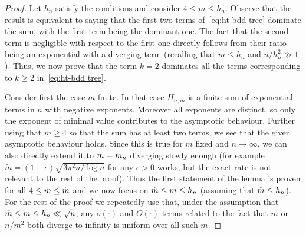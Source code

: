 \documentclass{article}
\newcommand{\1}{\mathbbm{1}}								%
\theoremstyle{definition}
\numberwithin{equation}{section}
\begin{document}
\begin{proof}
    Let $h_n$ satisfy the conditions and consider $4\leq m\leq h_n$.
    Observe that the result is equivalent to saying that the first two terms of~\eqref{eq:ht-bdd tree} dominate the sum, with the first term being the dominant one.
    The fact that the second term is negligible with respect to the first one directly follows from their ratio being an exponential with a diverging term (recalling that $m\leq h_n$ and $n/h_n^2\gg1$).
    Thus, we now prove that the term $k=2$ dominates all the terms corresponding to $k\geq2$ in~\eqref{eq:ht-bdd tree}.

    Consider first the case $m$ finite.
    In that case $H_{n,m}$ is a finite sum of exponential terms in $n$ with negative exponents.
    Moreover all exponents are distinct, so only the exponent of minimal value contributes to the asymptotic behaviour.
    Further using that $m\geq4$ so that the sum has at least two terms, we see that the given asymptotic behaviour holds.
    Since this is true for $m$ fixed and $n\rightarrow\infty$, we can also directly extend it to $\Tilde{m}=\Tilde{m}_n$ diverging slowly enough (for example $\tilde{m}=(1-\epsilon)\sqrt{3\pi^2n/\log n}$ for any $\epsilon>0$ works, but the exact rate is not relevant to the rest of the proof).
    Thus the first statement of the lemma is proven for all $4\leq m\leq\Tilde{m}$ and we now focus on $\Tilde{m}\leq m\leq h_n$ (assuming that $\Tilde{m}\leq h_n$).
    For the rest of the proof we repeatedly use that, under the assumption that $\Tilde{m}\leq m\leq h_n\ll\sqrt{n}$, any $o(\cdot)$ and $O(\cdot)$ terms related to the fact that $m$ or $n/m^2$ both diverge to infinity is uniform over all such $m$.


\end{proof}
\end{document}
